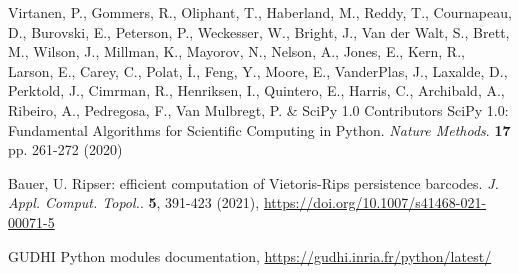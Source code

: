 \documentclass[twocolumn]{article}
\begin{document}
\begin{thebibliography}{1}
    Virtanen, P., Gommers, R., Oliphant, T., Haberland, M., Reddy, T., Cournapeau, D., Burovski, E., Peterson, P., Weckesser, W., Bright, J., Van der Walt, S., Brett, M., Wilson, J., Millman, K., Mayorov, N., Nelson, A., Jones, E., Kern, R., Larson, E., Carey, C., Polat, İ., Feng, Y., Moore, E., VanderPlas, J., Laxalde, D., Perktold, J., Cimrman, R., Henriksen, I., Quintero, E., Harris, C., Archibald, A., Ribeiro, A., Pedregosa, F., Van Mulbregt, P. \& SciPy 1.0 Contributors SciPy 1.0: Fundamental Algorithms for Scientific Computing in Python. {\em Nature Methods}. \textbf{17} pp. 261-272 (2020)

    Bauer, U. Ripser: efficient computation of Vietoris-Rips persistence barcodes. {\em J. Appl. Comput. Topol.}. \textbf{5}, 391-423 (2021), \url{https://doi.org/10.1007/s41468-021-00071-5}

     GUDHI Python modules documentation, \url{https://gudhi.inria.fr/python/latest/}

\end{thebibliography}
\end{document}
